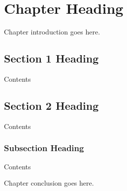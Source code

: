 \chapter{Chapter Heading}

Chapter introduction goes here.

\section{Section 1 Heading}

Contents \cite{dd2}

\section{Section 2 Heading}

Contents

\subsection{Subsection Heading}

Contents

\par 
Chapter conclusion goes here.